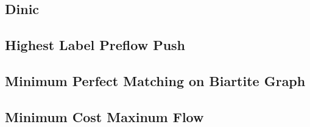 \subsection{Dinic}


\subsection{Highest Label Preflow Push}


\subsection{Minimum Perfect Matching on Biartite Graph}


\subsection{Minimum Cost Maxinum Flow}
